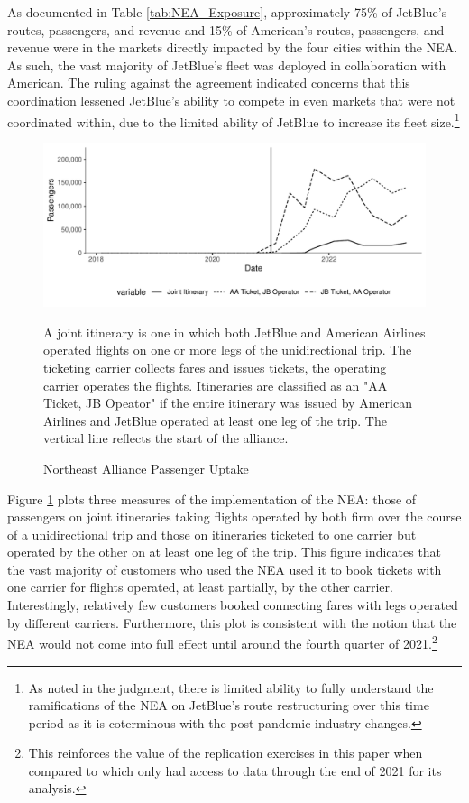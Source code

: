 \documentclass{article}
\begin{document}
	 As documented in Table \ref{tab:NEA_Exposure}, approximately 75\% of JetBlue's routes, passengers, and revenue and 15\% of American's routes, passengers, and revenue were in the markets directly impacted by the four cities within the NEA. As such, the vast majority of JetBlue's fleet was deployed in collaboration with American. The ruling against the agreement indicated concerns that this coordination lessened JetBlue's ability to compete in even markets that were not coordinated within, due to the limited ability of JetBlue to increase its fleet size.\footnote{As noted in the judgment, there is limited ability to fully understand the ramifications of the NEA on JetBlue's route restructuring over this time period as it is coterminous with the post-pandemic industry changes.}

    \begin{figure}
        \caption{Northeast Alliance Passenger Uptake}
        \label{fig:NEA_Uptake}
        \begin{center}
            \includegraphics[width = \linewidth]{05.Figures/NEA_OperationsGraph}
        \end{center}
        \vspace{-8mm}
        \footnotesize{A joint itinerary is one in which both JetBlue and American Airlines operated flights on one or more legs of the unidirectional trip. The ticketing carrier collects fares and issues tickets, the operating carrier operates the flights. Itineraries are classified as an "AA Ticket, JB Opeator" if the entire itinerary was issued by American Airlines and JetBlue operated at least one leg of the trip. The vertical line reflects the start of the alliance. }
    \end{figure}

    Figure \ref{fig:NEA_Uptake} plots three measures of the implementation of the NEA: those of passengers on joint itineraries taking flights operated by both firm over the course of a unidirectional trip and those on itineraries ticketed to one carrier but operated by the other on at least one leg of the trip. This figure indicates that the vast majority of customers who used the NEA used it to book tickets with one carrier for flights operated, at least partially, by the other carrier. Interestingly, relatively few customers booked connecting fares with legs operated by different carriers. Furthermore, this plot is consistent with the notion that the NEA would not come into full effect until around the fourth quarter of 2021.\footnote{This reinforces the value of the replication exercises in this paper when compared to \citet{zou_assessing_2023} which only had access to data through the end of 2021 for its analysis.} 
    
\end{document}
